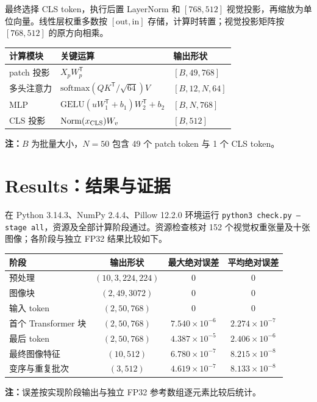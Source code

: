 \documentclass[a4paper,12pt]{article}
\begin{document}
最终选择 CLS token，执行后置 LayerNorm 和 $[768,512]$ 视觉投影，再缩放为单位向量。线性层权重多数按 $[\mathrm{out},\mathrm{in}]$ 存储，计算时转置；视觉投影矩阵按 $[768,512]$ 的原方向相乘。

\begin{center}
\small
\begin{tabular}{p{2.3cm}p{6.1cm}p{4.0cm}}
\toprule
计算模块 & 关键运算 & 输出形状 \\
\midrule
patch 投影 & $X_pW_p^\mathsf{T}$ & $[B,49,768]$ \\
多头注意力 & $\mathrm{softmax}(QK^\mathsf{T}/\sqrt{64})V$ & $[B,12,N,64]$ \\
MLP & $\mathrm{GELU}(uW_1^\mathsf{T}+b_1)W_2^\mathsf{T}+b_2$ & $[B,N,768]$ \\
CLS 投影 & $\mathrm{Norm}(x_{\rm CLS})W_v$ & $[B,512]$ \\
\bottomrule
\end{tabular}
\end{center}
\vspace{-0.15cm}
{\footnotesize\noindent\textbf{注：}$B$ 为批量大小，$N=50$ 包含 49 个 patch token 与 1 个 CLS token。\par}

\newpage
\section{Results：结果与证据}
在 Python 3.14.3、NumPy 2.4.4、Pillow 12.2.0 环境运行 \texttt{python3 check.py --stage all}，资源及全部计算阶段通过。资源检查核对 152 个视觉权重张量及十张图像；各阶段与独立 FP32 结果比较如下。

\begin{center}
\small
\begin{tabular}{lccc}
\toprule
阶段 & 输出形状 & 最大绝对误差 & 平均绝对误差 \\
\midrule
预处理 & $(10,3,224,224)$ & $0$ & $0$ \\
图像块 & $(2,49,3072)$ & $0$ & $0$ \\
输入 token & $(2,50,768)$ & $0$ & $0$ \\
首个 Transformer 块 & $(2,50,768)$ & $7.540\times10^{-6}$ & $2.274\times10^{-7}$ \\
最后 token & $(2,50,768)$ & $4.387\times10^{-5}$ & $2.406\times10^{-6}$ \\
最终图像特征 & $(10,512)$ & $6.780\times10^{-7}$ & $8.215\times10^{-8}$ \\
变序与重复批次 & $(3,512)$ & $4.619\times10^{-7}$ & $8.133\times10^{-8}$ \\
\bottomrule
\end{tabular}
\end{center}
\vspace{-0.15cm}
{\footnotesize\noindent\textbf{注：}误差按实现阶段输出与独立 FP32 参考数组逐元素比较后统计。\par}
\end{document}
